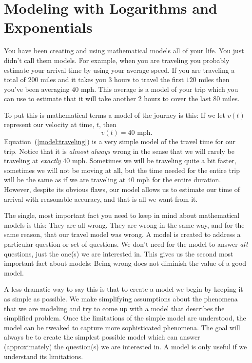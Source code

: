 \section{Modeling with Logarithms and Exponentials}
\label{sec:modell-with-logar}

You have been creating and using mathematical models all of your
life. You just didn't call them models. For example, when you are
traveling you probably estimate your arrival time by using your
average speed. If you are traveling a total of $200$ miles and it
takes you $3$ hours to travel the first $120$ miles then you've been
averaging $40$ mph.  This average is a model of your trip which you
can use to estimate that it will take another $2$ hours to cover the
last $80$ miles.

To put this is mathematical terms a model of the journey is this: If
we let $v(t)$ represent our velocity at time, $t$, then
\begin{equation}
  v(t) = 40\text{ mph.}\label{model:traveling}
\end{equation}
Equation~(\ref{model:traveling}) is a very simple model of the travel
time for our trip.  Notice that it is \emph{almost always} wrong in
the sense that we will rarely be traveling at \emph{exactly} $40$
mph. Sometimes we will be traveling quite a bit faster, sometimes we
will not be moving at all, but the time needed for the entire trip
will be the same as if we are traveling at $40$ mph for the entire
duration. However, despite its obvious flaws, our model allows us to
estimate our time of arrival with reasonable accuracy, and that is all
we want from it.

The single, most important fact you need to keep in mind about
mathematical models is this: They are all wrong. They are wrong in the
same way, and for the same reason, that our travel model was wrong. A
model is created to address a particular question or set of
questions. We don't need for the model to answer \emph{all} questions,
just the one(s) we are interested in.  This gives us the second most
important fact about models: Being wrong does not diminish the value
of a good model.

A less dramatic way to say this is that to create a model we begin by
keeping it as simple as possible. We make simplifying assumptions
about the phenomena that we are modeling and try to come up with a
model that describes the simplified problem.  Once the limitations of
the simple model are understood, the model can be tweaked to capture
more sophisticated phenomena. The goal will always be to create the
simplest possible model which can answer (approximately) the
question(s) we are interested in. A model is only useful if we
understand its limitations.

